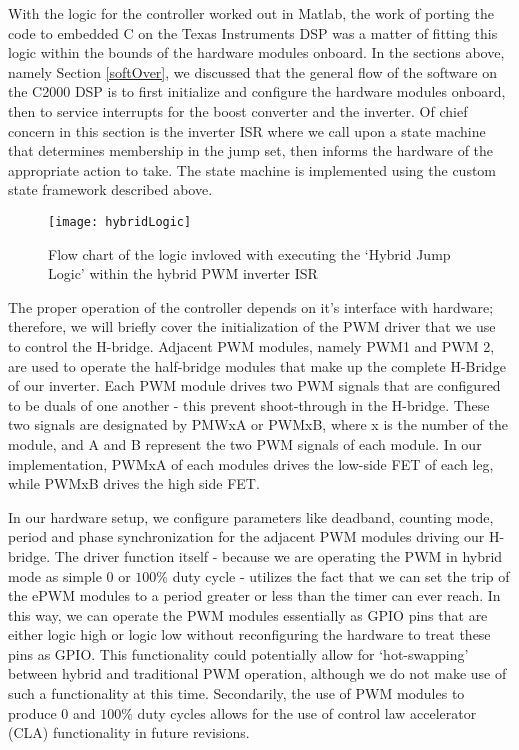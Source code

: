 With the logic for the controller worked out in Matlab, the work of porting the code to embedded C on the Texas Instruments DSP was a matter of fitting this logic within the bounds of the hardware modules onboard.
In the sections above, namely Section \ref{softOver}, we discussed that the general flow of the software on the C2000 DSP is to first initialize and configure the hardware modules onboard, then to service interrupts for the boost converter and the inverter. Of chief concern in this section is the inverter ISR where we call upon a state machine that determines membership in the jump set, then informs the hardware of the appropriate action to take. The state machine is implemented using the custom state framework described above.

\begin{figure}[h]
\begin{center}
\texttt{[image: hybridLogic]}
\caption{Flow chart of the logic invloved with executing the `Hybrid Jump Logic' within the hybrid PWM inverter ISR}
\label{fast}
\end{center}
\end{figure}

The proper operation of the controller depends on it's interface with hardware; therefore, we will briefly cover the initialization of the PWM driver that we use to control the H-bridge. Adjacent PWM modules, namely PWM1 and PWM 2, are used to operate the half-bridge modules that make up the complete H-Bridge of our inverter. Each PWM module drives two PWM signals that are configured to be duals of one another - this prevent shoot-through in the H-bridge. These two signals are designated by PMWxA or PWMxB, where x is the number of the module, and A and B represent the two PWM signals of each module. In our implementation, PWMxA of each modules drives the low-side FET of each leg, while PWMxB drives the high side FET. 

In our hardware setup, we configure parameters like deadband, counting mode, period and phase synchronization for the adjacent PWM modules driving our H-bridge. The driver function itself - because we are operating the PWM in hybrid mode as simple $0$ or $100\%$ duty cycle - utilizes the fact that we can set the trip of the ePWM modules to a period greater or less than the timer can ever reach. In this way, we can operate the PWM modules essentially as GPIO pins that are either logic high or logic low without reconfiguring the hardware to treat these pins as GPIO. This functionality could potentially allow for `hot-swapping' between hybrid and traditional PWM operation, although we do not make use of such a functionality at this time. Secondarily, the use of PWM modules to produce $0$ and $100\%$ duty cycles allows for the use of control law accelerator (CLA) functionality in future revisions. 

